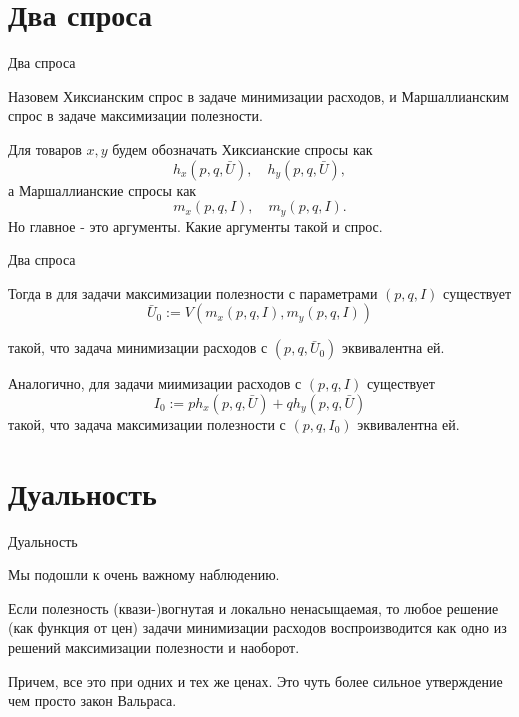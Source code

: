 \documentclass{beamer}
\begin{document}
\section{Два спроса}

\begin{frame}{Два спроса}

\begin{definition}
Назовем \alert{Хиксианским спрос} в задаче минимизации расходов, и \alert{Маршаллианским спрос} в задаче максимизации полезности. 
\end{definition}

Для товаров $x,y$ будем обозначать Хиксианские спросы как 
$$h_x(p,q,\bar U), \quad h_y(p,q,\bar U),$$
а Маршаллианские спросы как
$$m_x(p,q,I), \quad m_y(p,q,I).$$
Но главное - это аргументы. Какие аргументы такой и спрос.

\end{frame}

\begin{frame}{Два спроса}

Тогда в для задачи максимизации полезности с параметрами $(p,q,I)$ существует 
$$ \bar U_0 := V(m_x(p,q,I), m_y(p,q,I))$$

такой, что задача минимизации расходов с $(p, q, \bar U_0)$ эквивалентна ей. 

Аналогично, для задачи миимизации расходов с $(p, q, I)$ существует
$$ I_0 := p h_x(p,q, \bar U) + q h_y(p,q, \bar U)$$
такой, что задача максимизации полезности с $(p, q, I_0)$ эквивалентна ей. 

\end{frame}

\section{Дуальность}

\begin{frame}{Дуальность}

Мы подошли к очень важному наблюдению.

\begin{theorem}[Дуальность]

Если полезность (квази-)вогнутая и локально ненасыщаемая, то любое решение (как функция от цен) задачи минимизации расходов воспроизводится как одно из решений максимизации полезности и наоборот.
\end{theorem}
Причем, все это при одних и тех же ценах. Это чуть более сильное утверждение чем просто закон Вальраса.

\end{frame}
\end{document}
